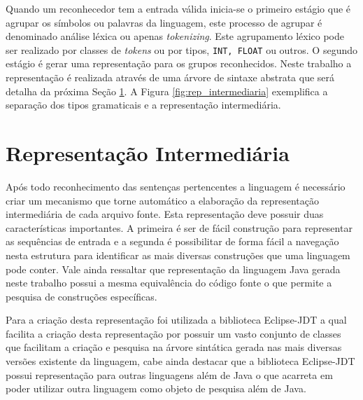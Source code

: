 Quando um reconhecedor tem a entrada válida inicia-se o primeiro estágio que é agrupar os símbolos ou palavras da linguagem, este processo de agrupar é denominado análise léxica ou apenas \textit{tokenizing}. Este agrupamento léxico pode ser realizado por classes de \textit{tokens} ou por tipos, \texttt{INT, FLOAT} ou outros. O segundo estágio é gerar uma representação para os grupos reconhecidos. Neste trabalho a representação é realizada através de uma árvore de sintaxe abstrata que será detalha da próxima Seção \ref{sec:parser}. A Figura \ref{fig:rep_intermediaria} exemplifica a separação dos tipos gramaticais e a representação intermediária.



\section{Representação Intermediária}\label{sec:parser}
Após todo reconhecimento das sentenças pertencentes a linguagem é necessário criar um mecanismo que torne automático a elaboração da representação intermediária de cada arquivo fonte. Esta representação deve possuir duas características importantes. A primeira é ser de fácil construção para representar as sequências de entrada e a segunda é possibilitar de forma fácil a navegação nesta estrutura para identificar as mais diversas construções que uma linguagem pode conter. Vale ainda ressaltar que representação da linguagem Java gerada neste trabalho possui a mesma equivalência do código fonte o que permite a pesquisa de construções específicas. 

Para a criação desta representação foi utilizada a biblioteca Eclipse-JDT a qual facilita a criação desta representação por possuir um vasto conjunto de classes que facilitam a criação e pesquisa na árvore sintática gerada nas mais diversas versões existente da linguagem, cabe ainda destacar que a biblioteca Eclipse-JDT possui representação para outras linguagens além de Java o que acarreta em poder utilizar outra linguagem como objeto de pesquisa além de Java.
 

